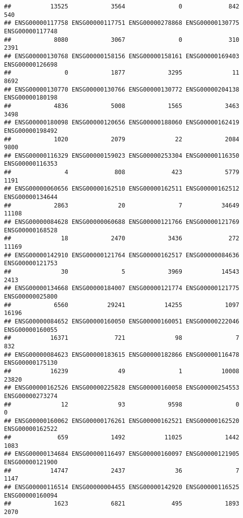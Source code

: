 \documentclass[
]{article}
\begin{document}
\begin{verbatim}
##           13525            3564               0             842             540 
## ENSG00000117758 ENSG00000117751 ENSG00000278868 ENSG00000130775 ENSG00000117748 
##            8080            3067               0             310            2391 
## ENSG00000130768 ENSG00000158156 ENSG00000158161 ENSG00000169403 ENSG00000126698 
##               0            1877            3295              11            8692 
## ENSG00000130770 ENSG00000130766 ENSG00000130772 ENSG00000204138 ENSG00000180198 
##            4836            5008            1565            3463            3498 
## ENSG00000180098 ENSG00000120656 ENSG00000188060 ENSG00000162419 ENSG00000198492 
##            1020            2079              22            2084            9800 
## ENSG00000116329 ENSG00000159023 ENSG00000253304 ENSG00000116350 ENSG00000116353 
##               4             808             423            5779            1191 
## ENSG00000060656 ENSG00000162510 ENSG00000162511 ENSG00000162512 ENSG00000134644 
##            2863              20               7           34649           11108 
## ENSG00000084628 ENSG00000060688 ENSG00000121766 ENSG00000121769 ENSG00000168528 
##              18            2470            3436             272           11169 
## ENSG00000142910 ENSG00000121764 ENSG00000162517 ENSG00000084636 ENSG00000121753 
##              30               5            3969           14543            2413 
## ENSG00000134668 ENSG00000184007 ENSG00000121774 ENSG00000121775 ENSG00000025800 
##            6560           29241           14255            1097           16196 
## ENSG00000084652 ENSG00000160050 ENSG00000160051 ENSG00000222046 ENSG00000160055 
##           16371             721              98               7             832 
## ENSG00000084623 ENSG00000183615 ENSG00000182866 ENSG00000116478 ENSG00000175130 
##           16239              49               1           10008           23820 
## ENSG00000162526 ENSG00000225828 ENSG00000160058 ENSG00000254553 ENSG00000273274 
##              12              93            9598               0               0 
## ENSG00000160062 ENSG00000176261 ENSG00000162521 ENSG00000162520 ENSG00000162522 
##             659            1492           11025            1442            1083 
## ENSG00000134684 ENSG00000116497 ENSG00000160097 ENSG00000121905 ENSG00000121900 
##           14747            2437              36               7            1147 
## ENSG00000116514 ENSG00000004455 ENSG00000142920 ENSG00000116525 ENSG00000160094 
##            1623            6821             495            1893            2070 

\end{verbatim}
\end{document}
